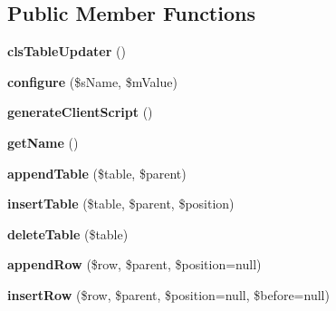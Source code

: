 \subsection*{Public Member Functions}
\begin{DoxyCompactItemize}
\item 
\hypertarget{classclsTableUpdater_aec390e3873481b099305737b71bec683}{
{\bfseries clsTableUpdater} ()}
\label{classclsTableUpdater_aec390e3873481b099305737b71bec683}

\item 
\hypertarget{classclsTableUpdater_a5ab10d4d27cba967330f6c7ae9c9c0c2}{
{\bfseries configure} (\$sName, \$mValue)}
\label{classclsTableUpdater_a5ab10d4d27cba967330f6c7ae9c9c0c2}

\item 
\hypertarget{classclsTableUpdater_a7e8dc7cdb74b909b1e97452a8fee3a6f}{
{\bfseries generateClientScript} ()}
\label{classclsTableUpdater_a7e8dc7cdb74b909b1e97452a8fee3a6f}

\item 
\hypertarget{classclsTableUpdater_a39ad86519b7844ed2c732a29cece09bd}{
{\bfseries getName} ()}
\label{classclsTableUpdater_a39ad86519b7844ed2c732a29cece09bd}

\item 
\hypertarget{classclsTableUpdater_a4206d360b242d53087a39616e833df97}{
{\bfseries appendTable} (\$table, \$parent)}
\label{classclsTableUpdater_a4206d360b242d53087a39616e833df97}

\item 
\hypertarget{classclsTableUpdater_ae912f31cb7d9cd845d72200cb8c57583}{
{\bfseries insertTable} (\$table, \$parent, \$position)}
\label{classclsTableUpdater_ae912f31cb7d9cd845d72200cb8c57583}

\item 
\hypertarget{classclsTableUpdater_a6f01d4fe5620285d3e0806b70c73194b}{
{\bfseries deleteTable} (\$table)}
\label{classclsTableUpdater_a6f01d4fe5620285d3e0806b70c73194b}

\item 
\hypertarget{classclsTableUpdater_a4f1484f0eb506d38aa899b9c813c13d3}{
{\bfseries appendRow} (\$row, \$parent, \$position=null)}
\label{classclsTableUpdater_a4f1484f0eb506d38aa899b9c813c13d3}

\item 
\hypertarget{classclsTableUpdater_a6a55143e8df50891549f78b30ee969a7}{
{\bfseries insertRow} (\$row, \$parent, \$position=null, \$before=null)}
\label{classclsTableUpdater_a6a55143e8df50891549f78b30ee969a7}


\end{DoxyCompactItemize}
